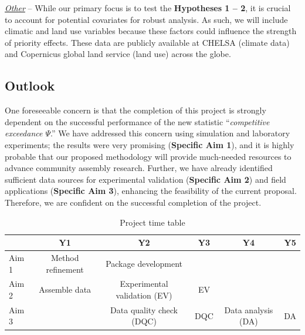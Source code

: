\documentclass[12pt, class=article, crop=false]{standalone}
\begin{document}

\ul{\textit{Other}} -- 
While our primary focus is to test the \textbf{Hypotheses 1 -- 2}, it is crucial to account for potential covariates for robust analysis.
As such, we will include climatic and land use variables because these factors could influence the strength of priority effects.
These data are publicly available at CHELSA \citep{karger_climatologies_2017} (climate data) and Copernicus global land service \citep{marcel_buchhorn_copernicus_2020} (land use) across the globe.

\subsection*{Outlook}

One foreseeable concern is that the completion of this project is strongly dependent on the successful performance of the new statistic ``\textit{competitive exceedance $\Psi$}.''
We have addressed this concern using simulation and laboratory experiments; the results were very promising (\textbf{Specific Aim 1}), and it is highly probable that our proposed methodology will provide much-needed resources to advance community assembly research.
Further, we have already identified sufficient data sources for experimental validation (\textbf{Specific Aim 2}) and field applications (\textbf{Specific Aim 3}), enhancing the feasibility of the current proposal.
Therefore, we are confident on the successful completion of the project.

\begin{table}
    \centering
    \caption{Project time table}
    \begin{tabular}{lccccc}
         & Y1 &  Y2 & Y3 & Y4 & Y5\\
         \hline
         Aim 1 & Method refinement & Package development & & & \\
         Aim 2 & Assemble data & Experimental validation (EV) & EV &  & \\
         Aim 3 & & Data quality check (DQC) & DQC & Data analysis (DA) & DA \\
    \end{tabular}
    \label{tab:tt}
\end{table}

\newpage


\end{document}
